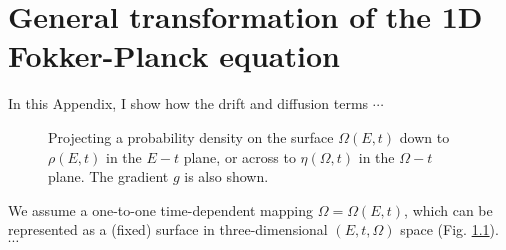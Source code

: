 
\chapter{General transformation of the 1D Fokker-Planck equation}
\label{ap:fokker}

In this Appendix, I show how the drift and diffusion terms $\cdots$



\begin{figure}[t]
\caption[Probability density on the surface $\Omega(E,t)$]{
Projecting a probability density on the surface $\Omega(E,t)$
down to $\rho(E,t)$ in the $E-t$ plane,
or across to $\eta(\Omega,t)$ in the $\Omega-t$ plane.
The gradient $g$ is also shown.
}
\label{fig:fokker}
\end{figure}


We assume a one-to-one time-dependent mapping $\Omega = \Omega(E,t)$,
which can be represented as a (fixed) surface in
three-dimensional $(E,t,\Omega)$ space (Fig. \ref{fig:fokker}).
 $\cdots$




